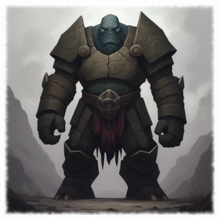 \begin{figure}[h]
\begin{center}
\includegraphics[scale=0.24]{img/ai-images/golem.png}
\end{center}
\end{figure}
